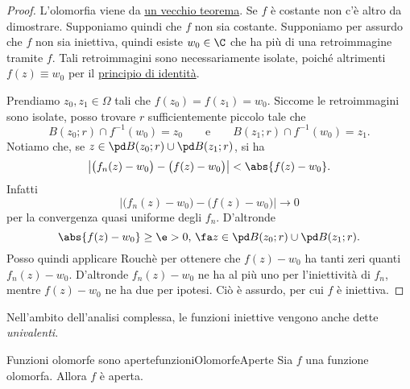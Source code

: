 \begin{proof}
	L'olomorfia viene da \hyperref[th:rigiditàOlomorfaConvergenza]{un vecchio teorema}.
	Se \(f\) è costante non c'è altro da dimostrare. Supponiamo quindi che \(f\) non sia costante.
	Supponiamo per assurdo che \(f\) non sia iniettiva, quindi esiste \(w_0\in \C\) che ha più di una retroimmagine tramite \(f\).
	Tali retroimmagini sono necessariamente isolate, poiché altrimenti \(f(z)\equiv w_0\) per il \hyperref[th:principioIdentità]{principio di identità}.

	Prendiamo \(z_0,z_1\in\Omega\) tali che \(f(z_0)=f(z_1)=w_0\). Siccome le retroimmagini sono isolate, posso trovare \(r\) sufficientemente piccolo tale che
	\[
		B(z_0;r) \cap f^{-1}(w_0) = z_0 \qquad\text{e}\qquad B(z_1;r) \cap f^{-1}(w_0) = z_1.
	\]
	Notiamo che, se \(z\in \pd B(z_0;r)\cup \pd B(z_1;r)\), si ha
	\[
		\big\lvert \big(f_n(z)-w_0\big) - \big(f(z)-w_0\big) \big\rvert < \abs{f(z)-w_0}.
	\]
	Infatti
	\[
		\big\lvert \big(f_n(z)-w_0\big) - \big(f(z)-w_0\big) \big\rvert \to 0
	\]
	per la convergenza quasi uniforme degli \(f_n\). D'altronde
	\[
		\abs{f(z)-w_0} \ge \e >0,\,\fa z\in \pd B(z_0;r)\cup \pd B(z_1;r).
	\]
	Posso quindi applicare Rouchè per ottenere che \(f(z)-w_0\) ha tanti zeri quanti \(f_n(z)-w_0\).
	D'altronde \(f_n(z)-w_0\) ne ha al più uno per l'iniettività di \(f_n\), mentre \(f(z)-w_0\) ne ha due per ipotesi. Ciò è assurdo, per cui \(f\) è iniettiva.
\end{proof}

\begin{notz}
	Nell'ambito dell'analisi complessa, le funzioni iniettive vengono anche dette \emph{univalenti}.
\end{notz}

\begin{teor}{Funzioni olomorfe sono aperte}{funzioniOlomorfeAperte}
	Sia \(f\) una funzione olomorfa. Allora \(f\) è aperta.
\end{teor}

